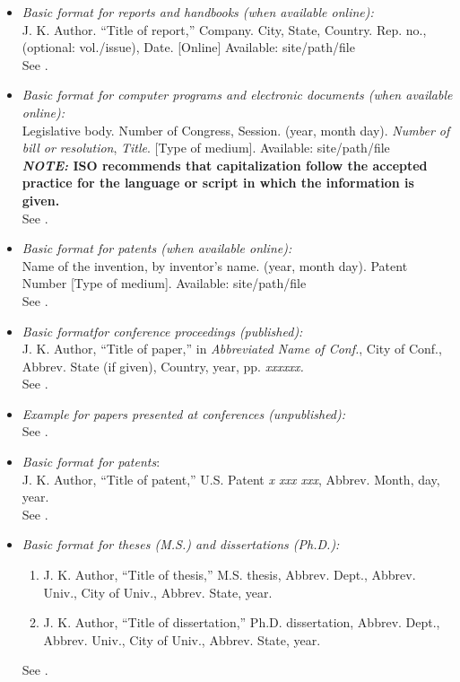 \documentclass[journal,twoside,web]{ieeecolor}
\begin{document}
\begin{itemize}
\item \emph{Basic format for reports and handbooks (when available online):}\\
J. K. Author. ``Title of report,'' Company. City, State, Country. Rep. no., (optional: vol./issue), Date. [Online] Available: site/path/file\\
See \cite{b18,b19}.

\item \emph{Basic format for computer programs and electronic documents (when available online): }\\
Legislative body. Number of Congress, Session. (year, month day). \emph{Number of bill or resolution}, \emph{Title}. [Type of medium]. Available: site/path/file\\
\textbf{\emph{NOTE: }ISO recommends that capitalization follow the accepted practice for the language or script in which the information is given.}\\
See \cite{b20}.

\item \emph{Basic format for patents (when available online):}\\
Name of the invention, by inventor's name. (year, month day). Patent Number [Type of medium]. Available: site/path/file\\
See \cite{b21}.

\item \emph{Basic format}\emph{for conference proceedings (published):}\\
J. K. Author, ``Title of paper,'' in \emph{Abbreviated Name of Conf.}, City of Conf., Abbrev. State (if given), Country, year, pp. \emph{xxxxxx.}\\
See \cite{b22}.

\item \emph{Example for papers presented at conferences (unpublished):}\\
See \cite{b23}.

\item \emph{Basic format for patents}$:$\\
J. K. Author, ``Title of patent,'' U.S. Patent \emph{x xxx xxx}, Abbrev. Month, day, year.\\
See \cite{b24}.

\item \emph{Basic format for theses (M.S.) and dissertations (Ph.D.):}
\begin{enumerate}
\item J. K. Author, ``Title of thesis,'' M.S. thesis, Abbrev. Dept., Abbrev. Univ., City of Univ., Abbrev. State, year.
\item J. K. Author, ``Title of dissertation,'' Ph.D. dissertation, Abbrev. Dept., Abbrev. Univ., City of Univ., Abbrev. State, year.
\end{enumerate}
See \cite{b25,b26}.


\end{itemize}
\end{document}
